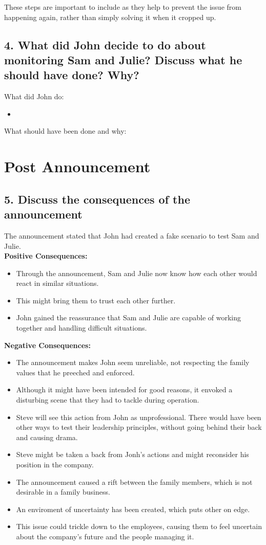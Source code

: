 \documentclass[a4paper,10pt]{article}
\begin{document}
These steps are important to include as they help to prevent the issue from happening again, rather than simply solving it when it cropped up.

\subsection{4. What did John decide to do about monitoring Sam and Julie? Discuss what he should have done? Why?}

What did John do:
\begin{itemize}
    \item 
\end{itemize}

What should have been done and why:

\section{Post Announcement}
\subsection{5. Discuss the consequences of the announcement}
The announcement stated that John had created a fake scenario to test Sam and Julie.\\

\textbf{Positive Consequences:}
\begin{itemize}
    \item Through the announcement, Sam and Julie now know how each other would react in similar situations.
    \item This might bring them to trust each other further.
    \item John gained the reassurance that Sam and Julie are capable of working together and handling difficult situations.
\end{itemize}

\textbf{Negative Consequences:}
\begin{itemize}
    \item The announcement makes John seem unreliable, not respecting the family values that he preeched and enforced.
    \item Although it might have been intended for good reasons, it envoked a disturbing scene that they had to tackle during operation.
    \item Steve will see this action from John as unprofessional. There would have been other ways to test their leadership principles, without going behind their back and causing drama.
    \item Steve might be taken a back from Jonh's actions and might reconsider his position in the company.
    \item The announcement caused a rift between the family members, which is not desirable in a family business.
    \item An enviroment of uncertainty has been created, which puts other on edge.
    \item This issue could trickle down to the employees, causing them to feel uncertain about the company's future and the people managing it.
\end{itemize}
\end{document}
